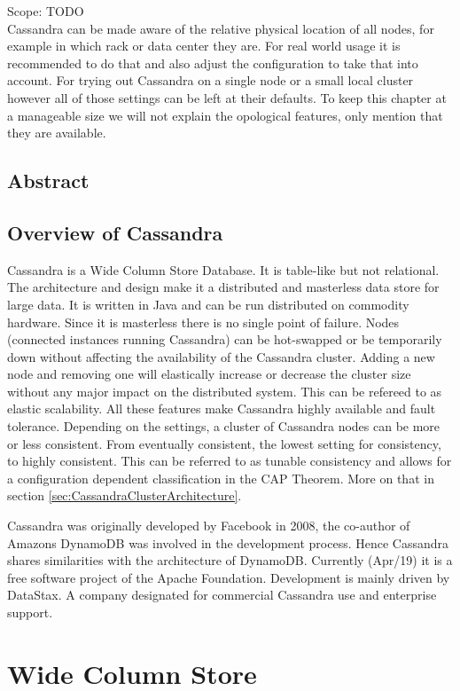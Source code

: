 Scope: TODO \\
Cassandra can be made aware of the relative physical location of all nodes, for example in which rack or data center they are. For real world usage it is recommended to do that and also adjust the configuration to take that into account. For trying out Cassandra on a single node or a small local cluster however all of those settings can be left at their defaults. To keep this chapter at a manageable size we will not explain the opological features, only mention that they are available.

\subsection{Abstract}
\subsection{Overview of Cassandra}
Cassandra is a Wide Column Store Database. It is table-like but not relational. The architecture and design make it a distributed and masterless data store for large data. It is written in Java and can be run distributed on commodity hardware. Since it is masterless there is no single point of failure. Nodes (connected instances running Cassandra) can be hot-swapped or be temporarily down without affecting the availability of the Cassandra cluster. Adding a new node and removing one will elastically increase or decrease the cluster size without any major impact on the distributed system. This can be refereed to as elastic scalability. All these features make Cassandra highly available and fault tolerance. Depending on the settings, a cluster of Cassandra nodes can be more or less consistent. From eventually consistent, the lowest setting for consistency, to highly consistent. This can be referred to as tunable consistency and allows for a configuration dependent classification in the CAP Theorem. More on that in section \ref{sec:CassandraClusterArchitecture}.

Cassandra was originally developed by Facebook in 2008, the co-author of Amazons DynamoDB was involved
in the development process. Hence Cassandra shares similarities with the architecture of DynamoDB.
Currently (Apr/19) it is a free software project of the Apache Foundation. Development is mainly driven by DataStax.
A company designated for commercial Cassandra use and enterprise support.

\section{Wide Column Store}

